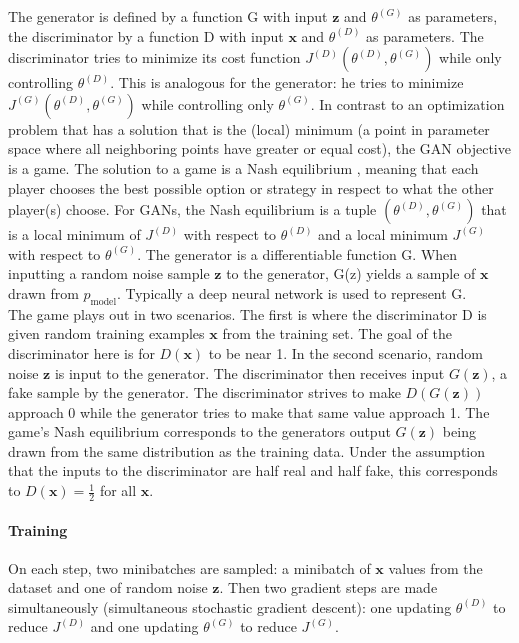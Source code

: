 The generator is defined by a function G with input $\mathbf{z}$ and $\theta^{(G)}$ as parameters, the discriminator by a function D with input $\mathbf{x}$ and $\theta^{(D)}$ as parameters. The discriminator tries to minimize its cost function $J^{(D)}(\theta^{(D)}, \theta^{(G)})$ while only controlling $\theta^{(D)}$. This is analogous for the generator: he tries to minimize $J^{(G)}(\theta^{(D)}, \theta^{(G)})$ while controlling only $\theta^{(G)}$. In contrast to an optimization problem that has a solution that is the (local) minimum (a point in parameter space where all neighboring points have greater or equal cost), the GAN objective is a game. The solution to a game is a Nash equilibrium \cite{Nash48}, meaning that each player chooses the best possible option or strategy in respect to what the other player(s) choose. For GANs, the Nash equilibrium is a tuple $(\theta^{(D)}, \theta^{(G)})$ that is a local minimum of $J^{(D)}$ with respect to $\theta^{(D)}$ and a local minimum $J^{(G)}$ with respect to $\theta^{(G)}$.
The generator is a differentiable function G. When inputting a random noise sample $\mathbf{z}$ to the generator, G(z) yields a sample of $\mathbf{x}$ drawn from $p_{\text{model}}$. Typically a deep neural network is used to represent G. \\
The game plays out in two scenarios. The first is where the discriminator D is given random training examples $\mathbf{x}$ from the training set. The goal of the discriminator here is for $D(\mathbf{x})$ to be near 1. In the second scenario, random noise $\mathbf{z}$ is input to the generator. The discriminator then receives input $G(\mathbf{z})$, a fake sample by the generator. The discriminator strives to make $D(G(\mathbf{z}))$ approach 0 while the generator tries to make that same value approach 1. The game's Nash equilibrium corresponds to the generators output $G(\mathbf{z})$ being drawn from the same distribution as the training data. Under the assumption that the inputs to the discriminator are half real and half fake, this corresponds to $D(\mathbf{x}) = \frac{1}{2}$ for all $\mathbf{x}$.

\paragraph{Training}
On each step, two minibatches are sampled: a minibatch of $\mathbf{x}$ values from the dataset and one of random noise $\mathbf{z}$. Then two gradient steps are made simultaneously (simultaneous stochastic gradient descent): one updating $\theta^{(D)}$ to reduce $J^{(D)}$ and one updating $\theta^{(G)}$ to reduce $J^{(G)}$.

